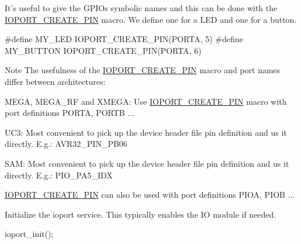 \begin{DoxyEnumerate}
\item It's useful to give the G\-P\-I\-Os symbolic names and this can be done with the \hyperlink{group__ioport__group_gabc09edad7c3187dec63ce47e6f1b3c51}{I\-O\-P\-O\-R\-T\-\_\-\-C\-R\-E\-A\-T\-E\-\_\-\-P\-I\-N} macro. We define one for a L\-E\-D and one for a button.
\begin{DoxyItemize}
\item 
\begin{DoxyCode}
\textcolor{preprocessor}{        #define MY\_LED    IOPORT\_CREATE\_PIN(PORTA, 5)}
\textcolor{preprocessor}{        #define MY\_BUTTON IOPORT\_CREATE\_PIN(PORTA, 6)}
\end{DoxyCode}

\item \begin{DoxyNote}{Note}
The usefulness of the \hyperlink{group__ioport__group_gabc09edad7c3187dec63ce47e6f1b3c51}{I\-O\-P\-O\-R\-T\-\_\-\-C\-R\-E\-A\-T\-E\-\_\-\-P\-I\-N} macro and port names differ between architectures\-:
\begin{DoxyItemize}
\item M\-E\-G\-A, M\-E\-G\-A\-\_\-\-R\-F and X\-M\-E\-G\-A\-: Use \hyperlink{group__ioport__group_gabc09edad7c3187dec63ce47e6f1b3c51}{I\-O\-P\-O\-R\-T\-\_\-\-C\-R\-E\-A\-T\-E\-\_\-\-P\-I\-N} macro with port definitions P\-O\-R\-T\-A, P\-O\-R\-T\-B ...
\item U\-C3\-: Most convenient to pick up the device header file pin definition and us it directly. E.\-g.\-: A\-V\-R32\-\_\-\-P\-I\-N\-\_\-\-P\-B06
\item S\-A\-M\-: Most convenient to pick up the device header file pin definition and us it directly. E.\-g.\-: P\-I\-O\-\_\-\-P\-A5\-\_\-\-I\-D\-X\par
 \hyperlink{group__ioport__group_gabc09edad7c3187dec63ce47e6f1b3c51}{I\-O\-P\-O\-R\-T\-\_\-\-C\-R\-E\-A\-T\-E\-\_\-\-P\-I\-N} can also be used with port definitions P\-I\-O\-A, P\-I\-O\-B ...
\end{DoxyItemize}
\end{DoxyNote}

\end{DoxyItemize}
\item Initialize the ioport service. This typically enables the I\-O module if needed.
\begin{DoxyItemize}
\item 
\begin{DoxyCode}
 ioport\_init(); 
\end{DoxyCode}


\end{DoxyItemize}
\end{DoxyEnumerate}

